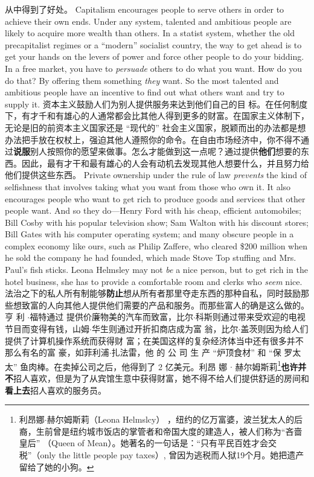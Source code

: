 \begin{paracol}{2}
从中得到了好处。
\switchcolumn*
Capitalism encourages people to serve others in order to
achieve their own ends. Under any system, talented and ambitious people are likely to acquire more wealth than others. In a
statist system, whether the old precapitalist regimes or a ``modern'' socialist country, the way to get ahead is to get your hands
on the levers of power and force other people to do your bidding. In a free market, you have to \textit{persuade} others to do what
you want. How do you do that? By offering them something
\textit{they} want. So the most talented and ambitious people have an
incentive to find out what others want and try to supply it.
\switchcolumn
资本主义鼓励人们为别人提供服务来达到他们自己的目
标。在任何制度下，有才千和有雄心的人通常都会比其他人得到更多的财富。在国家主义体制下，无论是旧的前资本主义国家还是 “现代的” 社会主义国家，脱颖而出的办法都是想办法把手放在权杖上，强迫其他人遵照你的命令。在自由市场经济中，你不得不通过\textbf{说服}别人按照你的愿望来做事。怎么才能做到这一点呢？通过提供\textbf{他们}想要的东西。因此，最有才干和最有雄心的人会有动机去发现其他人想要什么，并且努力给他们提供这些东西。
\switchcolumn*
Private ownership under the rule of law \textit{prevents} the kind of
selfishness that involves taking what you want from those who
own it. It also encourages people who want to get rich to produce goods and services that other people want. And so they
do---Henry Ford with his cheap, efficient automobiles; Bill
Cosby with his popular television show; Sam Walton with his discount stores; Bill Gates with his computer operating system;
and many obscure people in a complex economy like ours, such
as Philip Zaffere, who cleared \$200 million when he sold the
company he had founded, which made Stove Top stuffing and
Mrs. Paul's fish sticks. Leona Helmsley may not \textit{be} a nice person, but to get rich in the hotel business, she has to provide a
comfortable room and clerks who \textit{seem} nice.
\switchcolumn
法治之下的私人所有制能够\textbf{防止}想从所有者那里夺走东西的那种自私，同时鼓励那些想致富的人向其他人提供他们需要的产品和服务。而那些富人的确是这么做的。亨 利 $\cdot$福特通过
提供价廉物美的汽车而致富，比尔$\cdot$科斯则通过带来受欢迎的电视节目而变得有钱，山姆$\cdot$华生则通过开折扣商店成为富
翁，比尔$\cdot$盖茨则因为给人们提供了计算机操作系统而获得财
富；在美国这样的复杂经济体当中还有很多并不那么有名的富
豪，如菲利浦$\cdot$扎法雷，他 的 公 司 生 产 “炉顶食材” 和 “保
罗太太” 鱼肉棒。在卖掉公司之后，他得到了 2 亿美元。利昂
娜 $\cdot$ 赫尔姆斯莉\footnote{利昂娜$\cdot$赫尔姆斯莉（Leona  Helmslcy） ，纽约的亿万富婆，波兰犹太人的后裔，生前曾是纽约城市饭店的掌管者和帝国大度的建造人，被人们称为“吝啬皇后” （Queen  of Mean）。她著名的一句话是：“只有平民百姓才会交税”（only  the little people pay taxes）, 曾因为逃税而人狱19个月。她把遗产留给了她的小狗。}\textbf{也许并不}招人喜欢，但是为了从宾馆生意中获得财富，她不得不给人们提供舒适的房间和\textbf{看上去}招人喜欢的服务员。


\end{paracol}
